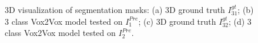 \begin{figure}[!htb]
\centering
{}\hfil
{}

\hfil 
{}

\caption{3D visualization of segmentation masks: (a) 3D ground truth $I^{gt}_{31}$; (b) 3 class Vox2Vox model tested on $I^{Pre}_1$; (c) 3D ground truth $I^{gt}_{32}$; (d) 3 class Vox2Vox model tested on $I^{Pre}_2$.}

\label{fig:results-vox2vox-3channel}

\end{figure}

